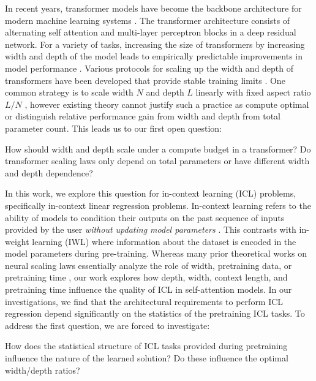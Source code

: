 \documentclass{article} %
\begin{document}
In recent years, transformer models have become the backbone architecture for modern machine learning systems \citep{vaswani2017attention, dosovitskiy2020image}. The transformer architecture consists of alternating self attention and multi-layer perceptron blocks in a deep residual network. For a variety of tasks, increasing the size of transformers by increasing width and depth of the model leads to empirically predictable improvements in model performance \citep{hestness2017deep, kaplan2020scaling, hoffmann2022training, achiam2023gpt}. Various protocols for scaling up the width and depth of transformers have been developed that provide stable training limits \citep{yang2021tuning, bordelon2023depthwise,bordelon2024infinite, chizat2024feature}. One common strategy is to scale width $N$ and depth $L$ linearly with fixed aspect ratio $L/N$ \citep{noci2023shaped,dey2025don}, however existing theory cannot justify such a practice as compute optimal or distinguish relative performance gain from width and depth from total parameter count. This leads us to our first open question:
\vspace{-5pt}
\begin{tcolorbox}[colframe=myblue, opacityback=0.95, title=Q1: What sets optimal Transformer shapes and scaling laws?]
How should width and depth scale under a compute budget in a transformer? Do transformer scaling laws only depend on total parameters or have different width and depth dependence?
\end{tcolorbox}
\vspace{-5pt}

In this work, we explore this question for in-context learning (ICL) problems, specifically in-context linear regression problems. In-context learning refers to the ability of models to condition their outputs on the past sequence of inputs provided by the user \textit{without updating model parameters} \citep{brown2020language}. This contrasts with in-weight learning (IWL) where information about the dataset is encoded in the model parameters during pre-training. Whereas many prior theoretical works on neural scaling laws essentially analyze the role of width, pretraining data, or pretraining time \citep{bahri2021explaining, maloney2022solvable, simon2023more, bordelon2024dynamical, paquette20244+, lin2024scaling,bordelon2025feature}, our work explores how depth, width, context length, and pretraining time influence the quality of ICL in self-attention models. In our investigations, we find that the architectural requirements to perform ICL regression depend significantly on the statistics of the pretraining ICL tasks. To address the first question, we are forced to investigate:
\begin{tcolorbox}[colframe=myblue,opacityback=0.95,  title=Q2: What task properties influence ICL solution]
How does the statistical structure of ICL tasks provided during pretraining influence the nature of the learned solution? Do these influence the optimal width/depth ratios?
\end{tcolorbox}
\end{document}
